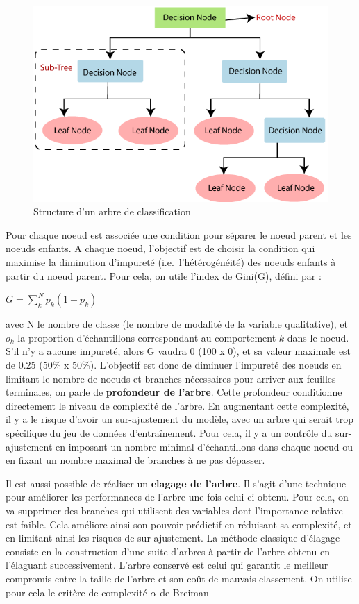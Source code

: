 \documentclass[
]{article}
\begin{document}
\begin{figure}
\centering
\includegraphics{ML/Tree.png}
\caption{Structure d'un arbre de classification}
\end{figure}

Pour chaque noeud est associée une condition pour séparer le noeud
parent et les noeuds enfants. A chaque noeud, l'objectif est de choisir
la condition qui maximise la diminution d'impureté
(i.e.~l'hétérogénéité) des noeuds enfants à partir du noeud parent. Pour
cela, on utile l'index de Gini(G), défini par :

\begin{center}
$G=\sum_k^Np_k(1-p_k)$
\end{center}

avec N le nombre de classe (le nombre de modalité de la variable
qualitative), et \(o_k\) la proportion d'échantillons correspondant au
comportement \(k\) dans le noeud. S'il n'y a aucune impureté, alors G
vaudra 0 (100 x 0), et sa valeur maximale est de 0.25 (50\% x 50\%).
L'objectif est donc de diminuer l'impureté des noeuds en limitant le
nombre de noeuds et branches nécessaires pour arriver aux feuilles
terminales, on parle de \textbf{profondeur de l'arbre}. Cette profondeur
conditionne directement le niveau de complexité de l'arbre. En
augmentant cette complexité, il y a le risque d'avoir un sur-ajustement
du modèle, avec un arbre qui serait trop spécifique du jeu de données
d'entraînement. Pour cela, il y a un contrôle du sur-ajustement en
imposant un nombre minimal d'échantillons dans chaque noeud ou en fixant
un nombre maximal de branches à ne pas dépasser.

Il est aussi possible de réaliser un \textbf{elagage de l'arbre}. Il
s'agit d'une technique pour améliorer les performances de l'arbre une
fois celui-ci obtenu. Pour cela, on va supprimer des branches qui
utilisent des variables dont l'importance relative est faible. Cela
améliore ainsi son pouvoir prédictif en réduisant sa complexité, et en
limitant ainsi les risques de sur-ajustement. La méthode classique
d'élagage consiste en la construction d'une suite d'arbres à partir de
l'arbre obtenu en l'élaguant successivement. L'arbre conservé est celui
qui garantit le meilleur compromis entre la taille de l'arbre et son
coût de mauvais classement. On utilise pour cela le critère de
complexité \(\alpha\) de Breiman
\end{document}
